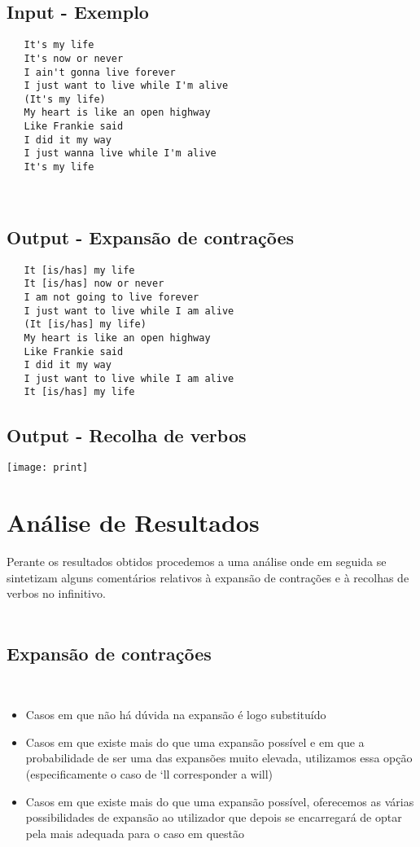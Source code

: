 \documentclass{report}
\begin{document}
\section{Input - Exemplo}
\begin{verbatim}
   It's my life
   It's now or never
   I ain't gonna live forever
   I just want to live while I'm alive
   (It's my life)
   My heart is like an open highway
   Like Frankie said
   I did it my way
   I just wanna live while I'm alive
   It's my life
\end{verbatim}
\\
\section{Output - Expansão de contrações}
\begin{verbatim}
   It [is/has] my life
   It [is/has] now or never
   I am not going to live forever
   I just want to live while I am alive
   (It [is/has] my life)
   My heart is like an open highway
   Like Frankie said
   I did it my way
   I just want to live while I am alive
   It [is/has] my life
\end{verbatim}
\newpage
\section{Output - Recolha de verbos}
\begin{center}
\texttt{[image: print]}
\end{center}
\chapter{Análise de Resultados}
Perante os resultados obtidos procedemos a uma análise onde em seguida se sintetizam alguns comentários relativos à expansão de contrações e à recolhas de verbos no infinitivo.
\\
\\
\section{Expansão de contrações}
\\
\begin{itemize}
      \item Casos em que não há dúvida na expansão é logo substituído
      \item Casos em que existe mais do que uma expansão possível e em que a probabilidade de ser uma das expansões muito elevada, utilizamos essa opção (especificamente o caso de ‘ll corresponder a will)
      \item Casos em que existe mais do que uma expansão possível, oferecemos as várias possibilidades de expansão ao utilizador que depois se encarregará de optar pela mais adequada para o  caso em questão

\end{itemize}
\\
\end{document}

